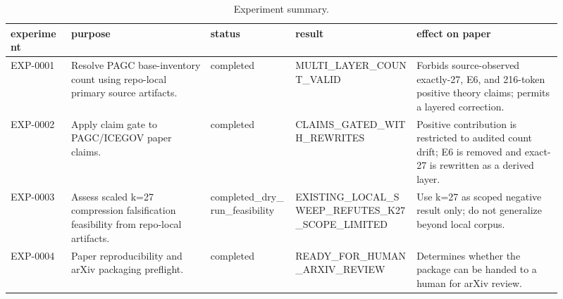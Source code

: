 \begin{table}[t]
\small
\caption{Experiment summary.}
\label{tab:experiments}
\begin{tabular}{p{0.10\linewidth}p{0.23\linewidth}p{0.14\linewidth}p{0.20\linewidth}p{0.24\linewidth}}
\hline
experiment & purpose & status & result & effect on paper \\
\hline
EXP-0001 & Resolve PAGC base-inventory count using repo-local primary source artifacts. & completed & MULTI\_LAYER\_COUNT\_VALID & Forbids source-observed exactly-27, E6, and 216-token positive theory claims; permits a layered correction. \\
EXP-0002 & Apply claim gate to PAGC/ICEGOV paper claims. & completed & CLAIMS\_GATED\_WITH\_REWRITES & Positive contribution is restricted to audited count drift; E6 is removed and exact-27 is rewritten as a derived layer. \\
EXP-0003 & Assess scaled k=27 compression falsification feasibility from repo-local artifacts. & completed\_dry\_run\_feasibility & EXISTING\_LOCAL\_SWEEP\_REFUTES\_K27\_SCOPE\_LIMITED & Use k=27 as scoped negative result only; do not generalize beyond local corpus. \\
EXP-0004 & Paper reproducibility and arXiv packaging preflight. & completed & READY\_FOR\_HUMAN\_ARXIV\_REVIEW & Determines whether the package can be handed to a human for arXiv review. \\
\hline
\end{tabular}
\end{table}
